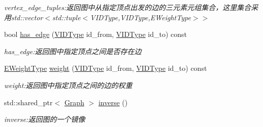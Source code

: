 \begin{DoxyCompactItemize}
\begin{DoxyCompactList}\small\item\em vertex\+\_\+edge\+\_\+tuples\+:返回图中从指定顶点出发的边的三元素元组集合，这里集合采用{\ttfamily std\+::vector$<$std\+::tuple$<$V\+I\+D\+Type,V\+I\+D\+Type,E\+Weight\+Type$>$$>$} \end{DoxyCompactList}\item 
bool \hyperlink{struct_introduction_to_algorithm_1_1_graph_algorithm_1_1_graph_a9ec6e834a0411b11e7701f429ed7c686}{has\+\_\+edge} (\hyperlink{struct_introduction_to_algorithm_1_1_graph_algorithm_1_1_graph_a60819f2040f2ac261a680db30b0f4409}{V\+I\+D\+Type} id\+\_\+from, \hyperlink{struct_introduction_to_algorithm_1_1_graph_algorithm_1_1_graph_a60819f2040f2ac261a680db30b0f4409}{V\+I\+D\+Type} id\+\_\+to) const 
\begin{DoxyCompactList}\small\item\em has\+\_\+edge\+:返回图中指定顶点之间是否存在边 \end{DoxyCompactList}\item 
\hyperlink{struct_introduction_to_algorithm_1_1_graph_algorithm_1_1_graph_ab398c44ce5ea13c66b38edfcbdd2cdc3}{E\+Weight\+Type} \hyperlink{struct_introduction_to_algorithm_1_1_graph_algorithm_1_1_graph_a14bd030d195198bd04828a9da8103a9f}{weight} (\hyperlink{struct_introduction_to_algorithm_1_1_graph_algorithm_1_1_graph_a60819f2040f2ac261a680db30b0f4409}{V\+I\+D\+Type} id\+\_\+from, \hyperlink{struct_introduction_to_algorithm_1_1_graph_algorithm_1_1_graph_a60819f2040f2ac261a680db30b0f4409}{V\+I\+D\+Type} id\+\_\+to) const 
\begin{DoxyCompactList}\small\item\em weight\+:返回图中指定顶点之间的边的权重 \end{DoxyCompactList}\item 
std\+::shared\+\_\+ptr$<$ \hyperlink{struct_introduction_to_algorithm_1_1_graph_algorithm_1_1_graph}{Graph} $>$ \hyperlink{struct_introduction_to_algorithm_1_1_graph_algorithm_1_1_graph_ace6d1e2910a70ea8fa8e3d3e688e29ba}{inverse} ()
\begin{DoxyCompactList}\small\item\em inverse\+:返回图的一个镜像 \end{DoxyCompactList}\end{DoxyCompactItemize}
